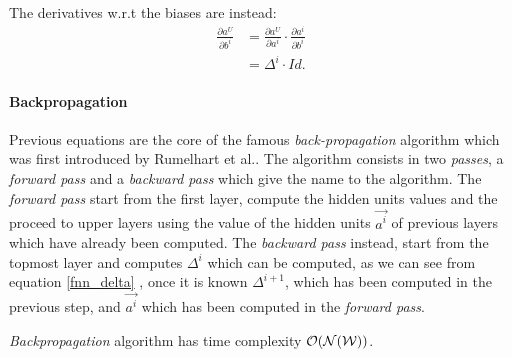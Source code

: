 The derivatives w.r.t the biases are instead:
\begin{align}
\frac{\partial a^U}{\partial b^i} &= \frac{\partial a^U}{\partial a^i} \cdot \frac{\partial a^i}{\partial b^i}\\
&= \Delta^{i} \cdot Id.
\end{align}


\paragraph{Backpropagation}

Previous equations are the core of the famous \textit{back-propagation} algorithm which was first introduced by Rumelhart et al.\cite{Rumelhart86}.
The algorithm consists in two \textit{passes}, a \textit{forward pass} and a \textit{backward pass} which give the name to the algorithm.
The \textit{forward pass} start from the first layer, compute the hidden units values and the proceed to upper layers using the value of the hidden units 
$\vec{a^i}$ of previous layers which have already been computed. The \textit{backward pass} instead, start from the topmost layer and computes $\Delta^{i}$
which can be computed, as we can see from equation \ref{fnn_delta} , once it is known $\Delta^{i+1}$, which has been computed in the previous step, and $\vec{a^i}$ which
has been computed in the \textit{forward pass}.

\textit{Backpropagation} algorithm has time complexity $\mathcal{O}(\mathcal{N}(\mathcal{W}))$.

